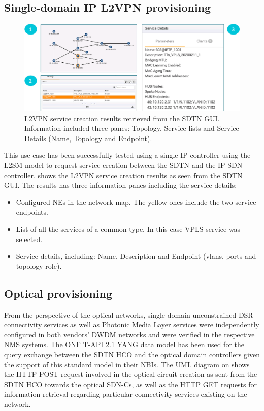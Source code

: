 \documentclass[a4paper,fleqn]{cas-dc}
\begin{document}
\subsection{Single-domain IP L2VPN provisioning}

\begin{figure}
	\centering
		\includegraphics[width=\linewidth]{figs/l2vpn_results.png}
	\caption{L2VPN service creation results retrieved from the SDTN GUI. Information included three panes: Topology, Service lists and Service Details (Name, Topology and Endpoint).}
	\label{FIG:L2SM_results}
\end{figure}

This use case has been successfully tested using a single IP controller using the L2SM model to request service creation between the SDTN and the IP SDN controller.  shows the L2VPN service creation results as seen from the SDTN GUI. The results has three information panes including the service details: 
\begin{itemize}
    \item Configured NEs in the network map. The yellow ones include the two service endpoints.
    \item List of all the services of a common type. In this case VPLS service was selected. 
    \item Service details, including: Name, Description and Endpoint (vlans, ports and topology-role). 
\end{itemize}

\subsection{Optical provisioning}
From the perspective of the optical networks, single domain unconstrained DSR connectivity services as well as Photonic Media Layer services were independently configured in both vendors’ DWDM networks and were verified in the respective NMS systems. The ONF T-API 2.1 YANG data model has been used for the query exchange between the SDTN HCO and the optical domain controllers given the support of this standard model in their NBIs. The UML diagram on  shows the HTTP POST request involved in the optical circuit creation as sent from the SDTN HCO towards the optical SDN-Cs, as well as the HTTP GET requests for information retrieval regarding particular connectivity services existing on the network. 
\end{document}
